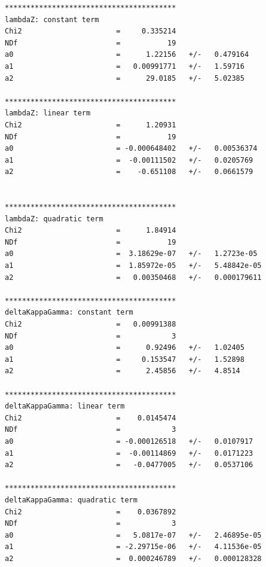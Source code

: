 \begin{verbatim}
****************************************
lambdaZ: constant term
Chi2                      =     0.335214
NDf                       =           19
a0                        =      1.22156   +/-   0.479164    
a1                        =   0.00991771   +/-   1.59716     
a2                        =      29.0185   +/-   5.02385     

****************************************
lambdaZ: linear term
Chi2                      =      1.20931
NDf                       =           19
a0                        = -0.000648402   +/-   0.00536374  
a1                        =  -0.00111502   +/-   0.0205769   
a2                        =    -0.651108   +/-   0.0661579   


****************************************
lambdaZ: quadratic term
Chi2                      =      1.84914
NDf                       =           19
a0                        =  3.18629e-07   +/-   1.2723e-05  
a1                        =  1.85972e-05   +/-   5.48842e-05 
a2                        =   0.00350468   +/-   0.000179611 

****************************************
deltaKappaGamma: constant term
Chi2                      =   0.00991388
NDf                       =            3
a0                        =      0.92496   +/-   1.02405     
a1                        =     0.153547   +/-   1.52898     
a2                        =      2.45856   +/-   4.8514      

****************************************
deltaKappaGamma: linear term
Chi2                      =    0.0145474
NDf                       =            3
a0                        = -0.000126518   +/-   0.0107917   
a1                        =  -0.00114869   +/-   0.0171223   
a2                        =   -0.0477005   +/-   0.0537106   

****************************************
deltaKappaGamma: quadratic term
Chi2                      =    0.0367892
NDf                       =            3
a0                        =   5.0817e-07   +/-   2.46895e-05 
a1                        = -2.29715e-06   +/-   4.11536e-05 
a2                        =  0.000246789   +/-   0.000128328 
\end{verbatim}
